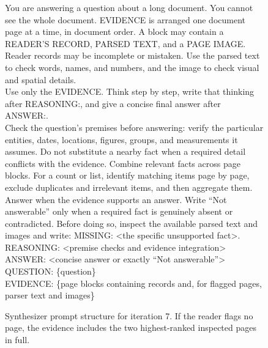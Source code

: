\begin{figure}[h]
\centering
\begin{tcolorbox}[
  colback=gray!5,colframe=gray!50,boxrule=0.4pt,
  fontupper=\small\ttfamily,left=6pt,right=6pt
]
You are answering a question about a long document. You cannot see the
whole document. EVIDENCE is arranged one document page at a time, in
document order. A block may contain a READER'S RECORD, PARSED TEXT, and a
PAGE IMAGE. Reader records may be incomplete or mistaken. Use the parsed
text to check words, names, and numbers, and the image to check visual
and spatial details.\\[0.5em]

Use only the EVIDENCE. Think step by step, write that thinking after
REASONING:, and give a concise final answer after ANSWER:.\\[0.5em]

Check the question's premises before answering: verify the particular
entities, dates, locations, figures, groups, and measurements it assumes.
Do not substitute a nearby fact when a required detail conflicts with
the evidence. Combine relevant facts across page blocks. For a count
or list, identify matching items page by page, exclude duplicates and
irrelevant items, and then aggregate them.\\[0.5em]

Answer when the evidence supports an answer. Write ``Not answerable''
only when a required fact is genuinely absent or contradicted. Before
doing so, inspect the available parsed text and images and write:
MISSING: <the specific unsupported fact>.\\[0.5em]

REASONING: <premise checks and evidence integration>\\
ANSWER: <concise answer or exactly ``Not answerable''>\\[0.5em]

QUESTION: \{question\}\\
EVIDENCE: \{page blocks containing records and, for flagged pages,
parser text and images\}
\end{tcolorbox}
\caption{Synthesizer prompt structure for iteration 7. If the reader flags no page, the evidence includes the two highest-ranked inspected pages in full.}
\label{fig:app_synthesizer_prompt}
\end{figure}
